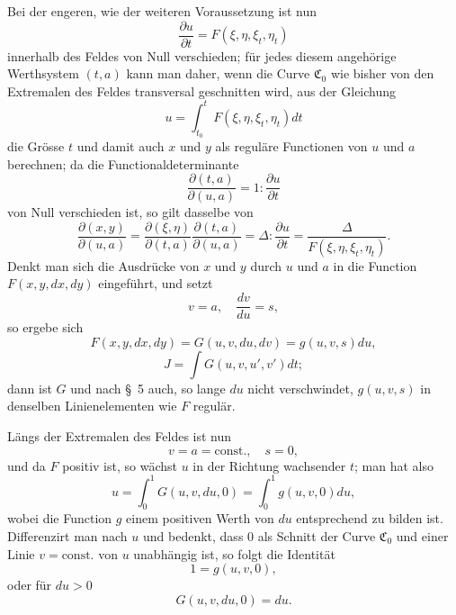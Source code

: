 \documentclass[11pt,a4paper,leqno]{article}
\begin{document}
Bei der engeren, wie der weiteren Voraussetzung ist nun
\[
\frac{\partial u}{\partial t}=F(\xi,\eta,\xi_t,\eta_t)
\]
innerhalb des Feldes von Null verschieden; für jedes diesem angehörige Werthsystem $(t,a)$ kann man daher, wenn die Curve $\mathfrak{C}_0$ wie bisher von den Extremalen des Feldes transversal geschnitten wird, aus der Gleichung
\[
u=\int_{t_0}^{t}F(\xi,\eta,\xi_t,\eta_t)dt
\]
die Grösse $t$ und damit auch $x$ und $y$ als reguläre Functionen von $u$ und $a$ berechnen; da die Functionaldeterminante
\[
\frac{\partial(t,a)}{\partial(u,a)}=1:\frac{\partial u}{\partial t}
\]
von Null verschieden ist, so gilt dasselbe von
\begin{equation}\tag{36}
\frac{\partial(x,y)}{\partial(u,a)}
=\frac{\partial(\xi,\eta)}{\partial(t,a)}\frac{\partial(t,a)}{\partial(u,a)}
=\Delta:\frac{\partial u}{\partial t}
=\frac{\Delta}{F(\xi,\eta,\xi_t,\eta_t)}.
\end{equation}
Denkt man sich die Ausdrücke von $x$ und $y$ durch $u$ und $a$ in die Function $F(x,y,dx,dy)$ eingeführt, und setzt
\[
v=a,
\quad \frac{dv}{du}=s,
\]
so ergebe sich
\[
F(x,y,dx,dy)=G(u,v,du,dv)=g(u,v,s)du,
\]
\[
J=\int G(u,v,u',v')dt;
\]
dann ist $G$ und nach \S~5 auch, so lange $du$ nicht verschwindet, $g(u,v,s)$ in denselben Linienelementen wie $F$ regulär.

Längs der Extremalen des Feldes ist nun
\[
v=a=\text{const.},\quad s=0,
\]
und da $F$ positiv ist, so wächst $u$ in der Richtung wachsender $t$; man hat also
\[
u=\int_0^1G(u,v,du,0)=\int_0^1g(u,v,0)du,
\]
wobei die Function $g$ einem positiven Werth von $du$ entsprechend zu bilden ist. Differenzirt man nach $u$ und bedenkt, dass 0 als Schnitt der Curve $\mathfrak{C}_0$ und einer Linie $v=\text{const.}$ von $u$ unabhängig ist, so folgt die Identität
\[
1=g(u,v,0),
\]
oder für $du>0$
\[
G(u,v,du,0)=du.
\]
\end{document}
